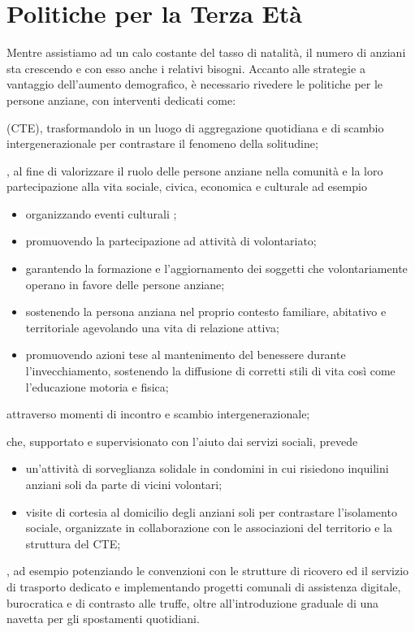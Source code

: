 \section{Politiche per la Terza Età}
Mentre assistiamo ad un calo costante del tasso di natalità, il numero di anziani sta crescendo e con esso anche i relativi bisogni. Accanto alle strategie a vantaggio dell'aumento demografico, è necessario rivedere le politiche per le persone anziane, con interventi dedicati come:

 (CTE), trasformandolo in un luogo di aggregazione quotidiana e di scambio intergenerazionale per contrastare il fenomeno della solitudine;

\begin{bluebox}
, al fine di valorizzare il ruolo delle persone anziane nella comunità e la loro partecipazione alla vita sociale, civica, economica e culturale ad esempio
\begin{itemize}
  \item organizzando eventi culturali %
  ;
  \item promuovendo la partecipazione ad attività di volontariato;
  \item garantendo la formazione e l'aggiornamento dei soggetti che volontariamente operano in favore delle persone anziane; 
  \item sostenendo la persona anziana nel proprio contesto familiare, abitativo e territoriale agevolando una vita di relazione attiva;
  \item promuovendo  azioni tese al mantenimento del benessere durante l'invecchiamento, sostenendo la diffusione di corretti stili di vita così come l'educazione motoria e fisica;
\end{itemize}
\end{bluebox}

attraverso momenti di incontro e scambio intergenerazionale;

 che, supportato e supervisionato con l'aiuto dai servizi sociali, prevede 
\begin{itemize}
  \item un'attività di sorveglianza solidale in condomini in cui risiedono inquilini anziani soli da parte di vicini volontari;  
  \item visite di cortesia al domicilio degli anziani soli per contrastare l'isolamento sociale, organizzate in collaborazione con le associazioni del territorio e la struttura del CTE;
\end{itemize}

, ad esempio potenziando le convenzioni con le strutture di ricovero ed il servizio di trasporto dedicato e implementando progetti comunali di assistenza digitale, burocratica e di contrasto alle truffe, oltre all'introduzione graduale di una navetta per gli spostamenti quotidiani.
